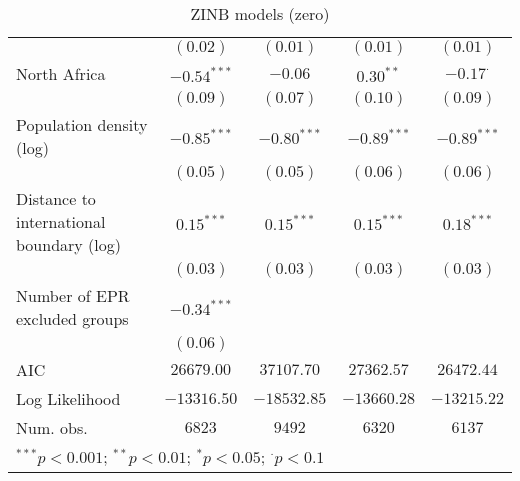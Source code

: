 \begin{sidewaystable}
\begin{center}
{\begin{tabular}{l c c c c}
                                         & $(0.02)$      & $(0.01)$      & $(0.01)$       & $(0.01)$        \\
North Africa                             & $-0.54^{***}$ & $-0.06$       & $0.30^{**}$    & $-0.17^{\cdot}$ \\
                                         & $(0.09)$      & $(0.07)$      & $(0.10)$       & $(0.09)$        \\
Population density (log)                 & $-0.85^{***}$ & $-0.80^{***}$ & $-0.89^{***}$  & $-0.89^{***}$   \\
                                         & $(0.05)$      & $(0.05)$      & $(0.06)$       & $(0.06)$        \\
Distance to international boundary (log) & $0.15^{***}$  & $0.15^{***}$  & $0.15^{***}$   & $0.18^{***}$    \\
                                         & $(0.03)$      & $(0.03)$      & $(0.03)$       & $(0.03)$        \\
Number of EPR excluded groups            & $-0.34^{***}$ &               &                &                 \\
                                         & $(0.06)$      &               &                &                 \\
\midrule
AIC                                      & $26679.00$    & $37107.70$    & $27362.57$     & $26472.44$      \\
Log Likelihood                           & $-13316.50$   & $-18532.85$   & $-13660.28$    & $-13215.22$     \\
Num. obs.                                & $6823$        & $9492$        & $6320$         & $6137$          \\
\bottomrule
\multicolumn{5}{l}{\scriptsize{$^{***}p<0.001$; $^{**}p<0.01$; $^{*}p<0.05$; $^{\cdot}p<0.1$}}
\end{tabular}
}
\caption{ZINB models (zero)}
\label{zinbz}
\end{center}
\end{sidewaystable}
